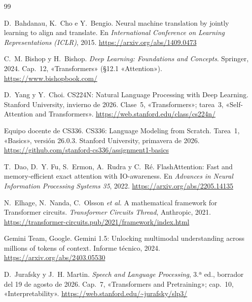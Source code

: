 \begin{thebibliography}{99}
\small

D.~Bahdanau, K.~Cho e Y.~Bengio.
\newblock Neural machine translation by jointly learning to align and translate.
\newblock En \emph{International Conference on Learning Representations (ICLR)}, 2015.
\newblock \url{https://arxiv.org/abs/1409.0473}

C.~M. Bishop y H.~Bishop.
\newblock \emph{Deep Learning: Foundations and Concepts}.
\newblock Springer, 2024.
\newblock Cap.~12, «Transformers» (§12.1 «Attention»).
\newblock \url{https://www.bishopbook.com/}

D.~Yang y Y.~Choi.
\newblock CS224N: Natural Language Processing with Deep Learning.
\newblock Stanford University, invierno de 2026. Clase~5, «Transformers»; tarea~3, «Self-Attention and Transformers».
\newblock \url{https://web.stanford.edu/class/cs224n/}

Equipo docente de CS336.
\newblock CS336: Language Modeling from Scratch. Tarea~1, «Basics», versión 26.0.3.
\newblock Stanford University, primavera de 2026.
\newblock \url{https://github.com/stanford-cs336/assignment1-basics}

T.~Dao, D.~Y. Fu, S.~Ermon, A.~Rudra y C.~Ré.
\newblock FlashAttention: Fast and memory-efficient exact attention with IO-awareness.
\newblock En \emph{Advances in Neural Information Processing Systems 35}, 2022.
\newblock \url{https://arxiv.org/abs/2205.14135}

N.~Elhage, N.~Nanda, C.~Olsson \emph{et al.}
\newblock A mathematical framework for Transformer circuits.
\newblock \emph{Transformer Circuits Thread}, Anthropic, 2021.
\newblock \url{https://transformer-circuits.pub/2021/framework/index.html}

Gemini Team, Google.
\newblock Gemini 1.5: Unlocking multimodal understanding across millions of tokens of context.
\newblock Informe técnico, 2024.
\newblock \url{https://arxiv.org/abs/2403.05530}

D.~Jurafsky y J.~H. Martin.
\newblock \emph{Speech and Language Processing}, 3.ª ed., borrador del 19 de agosto de 2026.
\newblock Cap.~7, «Transformers and Pretraining»; cap.~10, «Interpretability».
\newblock \url{https://web.stanford.edu/~jurafsky/slp3/}


\end{thebibliography}
